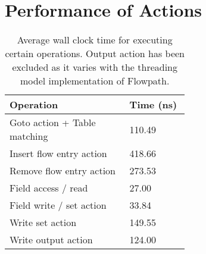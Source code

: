 \section{Performance of Actions} \label{exp:action_performance}


\begin{table}
\caption{Average wall clock time for executing certain operations. Output action has been excluded as it varies with the threading model implementation of Flowpath.}
\begin{center}
\begin{tabular}{| p{0.4\linewidth} || p{0.2\linewidth} | }
\hline
Operation & Time (ns)  \\
\hline
Goto action + Table matching & 110.49 \\
\hline
Insert flow entry action & 418.66 \\
\hline
Remove flow entry action & 273.53 \\
\hline
Field access / read & 27.00 \\
\hline
Field write / set action & 33.84 \\
\hline
Write set action &  149.55 \\
\hline
Write output action & 124.00 \\
\hline
\end{tabular}
\end{center}
\label{tbl:action_stats}
\end{table}
